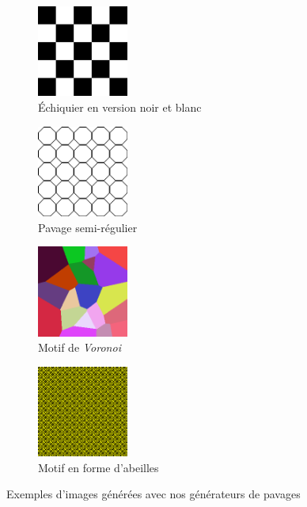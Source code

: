\documentclass[11pt]{article}
\begin{document}
\begin{figure}[H]
    \centering
    \begin{subfigure}{0.2\textwidth}
    \centering
            \includegraphics[width=3cm]{Images/echiquier.png}
        \caption{Échiquier en version noir et blanc}
        \label{fig:echiquier}
    \end{subfigure}
    \begin{subfigure}{0.2\textwidth}
    \centering
        \includegraphics[width=3cm]{Images/octagonal.png}
        \caption{Pavage semi-régulier}
        \label{fig:octagonal}
    \end{subfigure}
    \begin{subfigure}{0.2\textwidth}
    \centering
        \includegraphics[width=3cm]{Images/voronoi.png}
        \caption{Motif de \textit{Voronoi}}
        \label{fig:voronoi}
    \end{subfigure}
    \begin{subfigure}{0.2\textwidth}
        \centering
        \includegraphics[width=3cm]{Images/bee.png}
        \caption{Motif en forme d'abeilles}
        \label{fig:bee}
    \end{subfigure}
    \caption{Exemples d'images générées avec nos générateurs de pavages}
    \label{fig:tiling}
\end{figure}
\end{document}
